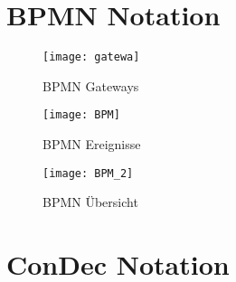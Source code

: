 \chapter{BPMN Notation}

\begin{figure}[!htbp]
\begin{center}
  \texttt{[image: gatewa]} %
  \caption{BPMN Gateways}
  \label{fig:gateways}
\end{center}
\end{figure}


\begin{figure}[!htbp]
\begin{center}
  \texttt{[image: BPM]} %
  \caption{BPMN Ereignisse}
  \label{fig:BPM}
\end{center}
\end{figure}

\begin{figure}[!htbp]
\begin{center}
  \texttt{[image: BPM\_2]} %
  \caption{BPMN Übersicht}
  \label{fig:BPM_2}
\end{center}
\end{figure}



\chapter{ConDec Notation}

 
 
